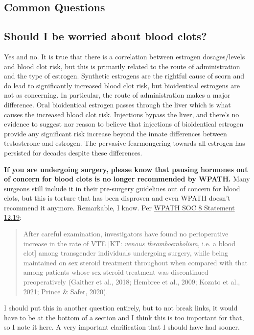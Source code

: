 \documentclass{article}
\begin{document}
\subsection*{Common Questions}

\subsection{Should I be worried about blood clots?}\label{11-1}

Yes and no. It is true that there is a correlation between estrogen dosages/levels and blood clot risk, but this is primarily related to the route of administration and the type of estrogen. Synthetic estrogens are the rightful cause of scorn and do lead to significantly increased blood clot risk, but bioidentical estrogens are not as concerning. In particular, the route of administration makes a major difference. Oral bioidentical estrogen passes through the liver which is what causes the increased blood clot risk. Injections bypass the liver, and there's no evidence to suggest nor reason to believe that injections of bioidentical estrogen provide any significant risk increase beyond the innate differences between testosterone and estrogen. The pervasive fearmongering towards all estrogen has persisted for decades despite these differences.

\textbf{If you are undergoing surgery, please know that pausing hormones out of concern for blood clots is no longer recommended by WPATH.} Many surgeons still include it in their pre-surgery guidelines out of concern for blood clots, but this is torture that has been disproven and even WPATH doesn't recommend it anymore. Remarkable, I know. Per \href{https://www.tandfonline.com/doi/pdf/10.1080/26895269.2022.2100644}{WPATH SOC 8 Statement 12.19}: \blockquote{After careful examination, investigators have found no perioperative increase in the rate of VTE [KT: \textit{venous thromboembolism}, i.e. a blood clot] among transgender individuals undergoing surgery, while being maintained on sex steroid treatment throughout when compared with that among patients whose sex steroid treatment was discontinued preoperatively (Gaither et al., 2018; Hembree et al., 2009; Kozato et al., 2021; Prince \& Safer, 2020).} I should put this in another question entirely, but to not break links, it would have to be at the bottom of a section and I think this is too important for that, so I note it here. A very important clarification that I should have had sooner.
\end{document}

